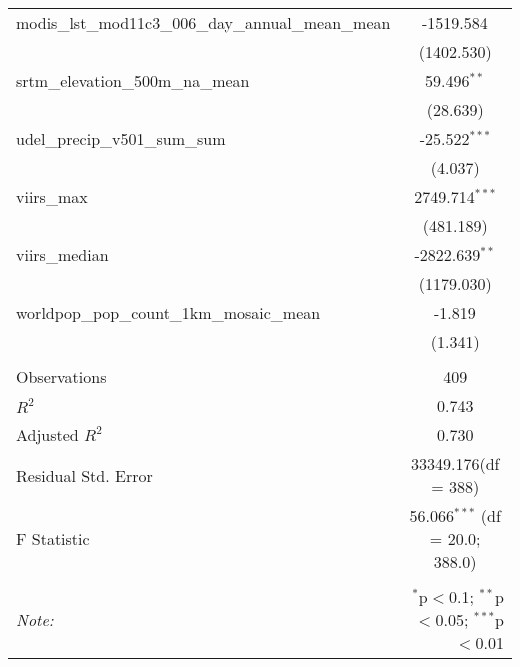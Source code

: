 \begin{table}[!htbp]
\begin{tabular}{@{\extracolsep{5pt}}lc}
 modis_lst_mod11c3_006_day_annual_mean_mean & -1519.584$^{}$ \\
  & (1402.530) \\
 srtm_elevation_500m_na_mean & 59.496$^{**}$ \\
  & (28.639) \\
 udel_precip_v501_sum_sum & -25.522$^{***}$ \\
  & (4.037) \\
 viirs_max & 2749.714$^{***}$ \\
  & (481.189) \\
 viirs_median & -2822.639$^{**}$ \\
  & (1179.030) \\
 worldpop_pop_count_1km_mosaic_mean & -1.819$^{}$ \\
  & (1.341) \\
\hline \\[-1.8ex]
 Observations & 409 \\
 $R^2$ & 0.743 \\
 Adjusted $R^2$ & 0.730 \\
 Residual Std. Error & 33349.176(df = 388)  \\
 F Statistic & 56.066$^{***}$ (df = 20.0; 388.0) \\
\hline
\hline \\[-1.8ex]
\textit{Note:} & \multicolumn{1}{r}{$^{*}$p$<$0.1; $^{**}$p$<$0.05; $^{***}$p$<$0.01} \\
\end{tabular}
\end{table}